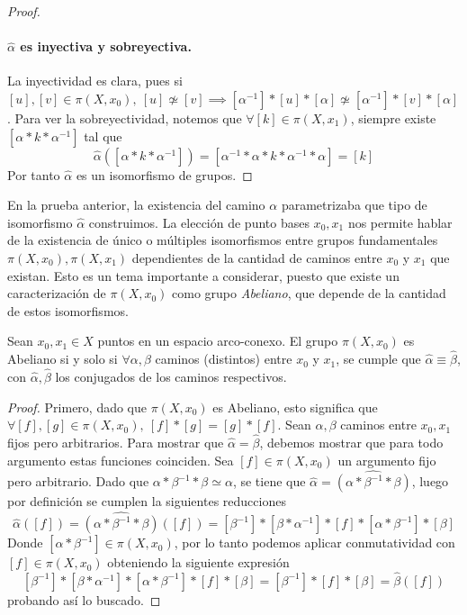 {\begin{proof}
  \paragraph{\(\hat \alpha\) es inyectiva y sobreyectiva.} La inyectividad es
  clara, pues si \([u],[v] \in \pi (X, x_0),\ [u] \not \simeq [v]
  \implies [\alpha^{-1}] * [u] * [\alpha] \not \simeq [\alpha^{-1}] * [v]
  * [\alpha]\). Para ver la sobreyectividad, notemos que \(\forall [k] \in
  \pi (X, x_1) \), siempre existe \( [\alpha * k * \alpha^{-1}]\) tal
  que
  \[ \hat \alpha ([\alpha * k * \alpha^{-1}]) = [\alpha^{-1} * \alpha * k *
    \alpha^{-1} * \alpha] = [k]\]
  Por tanto \(\hat \alpha\) es un isomorfismo de grupos.
\end{proof}
En la prueba anterior, la existencia del camino \(\alpha\)
parametrizaba que tipo de isomorfismo \(\hat \alpha\) construimos.
La elección de punto bases
\(x_0, x_1\) nos permite hablar de la existencia de único o múltiples
isomorfismos entre grupos fundamentales \(\pi (X, x_0), \pi (X, x_1) \)
dependientes de la cantidad de caminos entre \(x_0\) y \(x_1\) que
existan. Esto es un tema importante a considerar, puesto que existe un
caracterización de \(\pi (X, x_0) \) como grupo \emph{Abeliano}, que depende de
la cantidad de estos isomorfismos.
\begin{teorema}
  Sean \(x_0, x_1 \in X\) puntos en un espacio arco-conexo. El grupo
  \(\pi (X, x_0) \) es Abeliano si y solo si \(\forall \alpha, \beta\)
  caminos (distintos) entre \(x_0\) y \(x_1\), se cumple que \(\hat \alpha \equiv
  \hat \beta\), con \(\hat \alpha, \hat \beta\) los conjugados de los
  caminos respectivos.
\end{teorema}
\begin{proof}
  Primero, dado que \(\pi (X, x_0)\) es
  Abeliano, esto significa que \(\forall [f],[g] \in \pi (X, x_0),\ [f]
  * [g] = [g] * [f]\). Sean \(\alpha, \beta\) caminos entre \(x_0,x_1\)
  fijos pero arbitrarios. Para mostrar que \( \hat \alpha = \hat \beta\),
  debemos mostrar que para todo argumento estas funciones coinciden. Sea
  \([f] \in \pi (X, x_0) \) un argumento fijo pero arbitrario. Dado que
  \(\alpha * \beta^{-1} * \beta \simeq \alpha \), se tiene que
  \( \hat \alpha = \widehat{(\alpha * \beta^{-1} * \beta)}\), luego por definición
  se cumplen la siguientes reducciones
  \[ \hat \alpha ([f]) = \widehat{(\alpha * \beta^{-1} * \beta)} ([f]) =
    [\beta^{-1}] * [\beta * \alpha^{-1}] * [f] * [\alpha * \beta^{-1}]
    * [\beta] \]
  Donde \([\alpha * \beta^{-1}] \in \pi (X, x_0) \), por lo tanto podemos
  aplicar conmutatividad con \([f] \in \pi (X,x_0)\) obteniendo la
  siguiente expresión
  \[ [\beta^{-1}] * [\beta * \alpha^{-1}] * [\alpha * \beta^{-1}] * [f]
    * [\beta] = [\beta^{-1}] * [f] * [\beta] = \hat \beta ([f]) \]
  probando así lo buscado.


\end{proof}}
